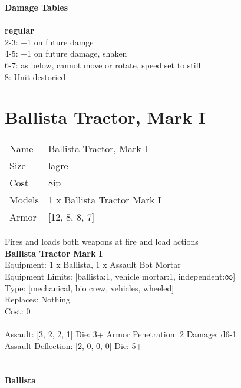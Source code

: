 {\bf Damage Tables} \\
\ \\ {\bf regular } \\
2-3: +1 on future damge \\
4-5: +1 on future damage, shaken \\
6-7: as below, cannot move or rotate, speed set to still \\
8: Unit destoried \\










\pagebreak\pagebreak

\section{ Ballista Tractor, Mark I }

\begin{tabular}{ll}
  Name & Ballista Tractor, Mark I \\
  Size & lagre\\
  Cost & 8ip\\
  Models & 1 x Ballista Tractor Mark I\\
  Armor & [12, 8, 8, 7]\\
\end{tabular}

\noindent Fires and loads both weapons at fire and load actions\\ 


{\bf Ballista Tractor Mark I } \\
Equipment: 1 x Ballista, 1 x Assault Bot Mortar \\
Equipment Limits: [ballista:1, vehicle mortar:1, independent:∞] \\
Type: [mechanical, bio crew, vehicles, wheeled] \\
Replaces: Nothing \\
Cost: 0\\
\ \\
Assault: [3, 2, 2, 1] Die: 3+ Armor Penetration: 2 Damage: d6-1 \\
Assault Deflection: [2, 0, 0, 0] Die: 5+\\
\indent  
\ \\

\ \\
{\bf Ballista } \\



